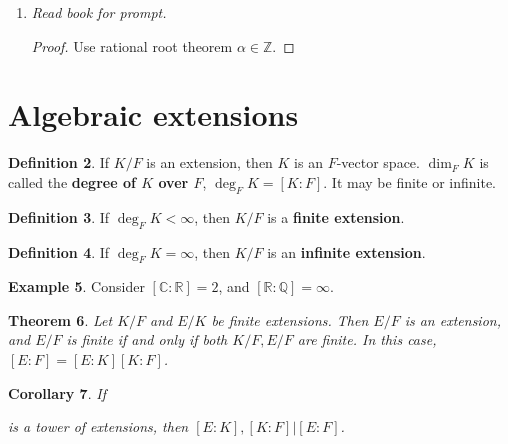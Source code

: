 \documentclass[9pt,reqno,twoside]{amsbook}
\theoremstyle{plain}
\newtheorem{theorem}{Theorem}[chapter]
\numberwithin{section}{chapter}
\numberwithin{equation}{chapter}
\newtheorem{Cor}[theorem]{Corollary}
\theoremstyle{definition}
\newtheorem{Def}[theorem]{Definition}
\newtheorem{Ex}[theorem]{Example}
\theoremstyle{remark}
\theoremstyle{plain}
\newcommand{\R}{\mathbb{R}}
\newcommand{\z}{\mathbb{Z}}
\newcommand{\Q}{\mathbb{Q}}
\renewcommand{\c}{\mathbb{C}}
\begin{document}
\begin{enumerate}[label=\arabic*.]
\begin{proof}
\begin{Ex}
Consider $F(x) \to F(x)$ by $x \mapsto x^2$. Note homomorphisms of fields are always injective. 
\end{Ex}
\end{proof}


\item \textit{Read book for prompt. }

\begin{proof}
Use rational root theorem $\alpha \in \z$. 
\end{proof}
\end{enumerate}




\section{Algebraic extensions}



\begin{Def}
If $K/F$ is an extension, then $K$ is an $F$-vector space. $\dim_FK$ is called the \textbf{degree of $K$ over $F$}, $\deg_FK = [K:F]$. It may be finite or infinite. 
\end{Def}

\begin{Def}
If $\deg_FK < \infty$, then $K/F$ is a \textbf{finite extension}. 
\end{Def}

\begin{Def}
If $\deg_FK = \infty$, then $K/F$ is an \textbf{infinite extension}. 
\end{Def}

\begin{Ex}
Consider $[\c:\R] = 2$, and $[\R:\Q] =\infty$. 
\end{Ex}

\begin{theorem}
Let $K/F$ and $E/K$ be finite extensions. Then $E/F$ is an extension, and $E/F$ is finite if and only if both $K/F,E/F$ are finite. In this case, $[E:F] = [E:K][K:F]$. 
\end{theorem}


\begin{Cor}
If 
\begin{center}
\end{center}
is a tower of extensions, then $[E:K],[K:F]|[E:F]$. 
\end{Cor}
\end{document}
